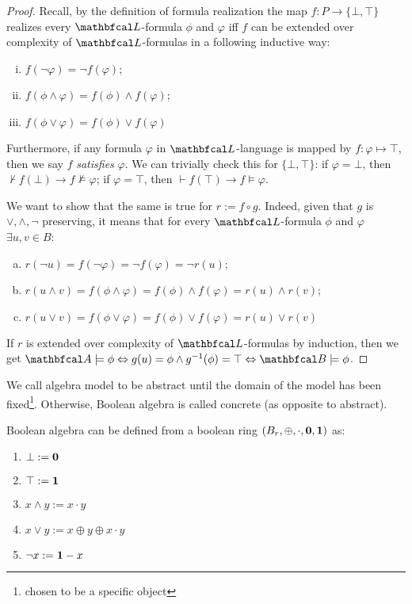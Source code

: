 \begin{proof}
  Recall, by the definition of formula realization\cite{halbeisen2012} the map $f: P \to \{\bot,\top\}$ realizes every $\lsign$-formula $\phi$ and $\varphi$ iff $f$ can be extended over complexity of $\lsign$-formulas in a following inductive way: 
  \begin{enumerate}[(i)]
    \item $f(\neg \varphi) = \neg f(\varphi)$;
    \item $f(\phi \land \varphi) = f(\phi) \land f(\varphi)$;
    \item $f(\phi \lor \varphi) = f(\phi) \lor f(\varphi)$
  \end{enumerate}
  Furthermore, if any formula $\varphi$ in $\lsign$-language is mapped by $f: \varphi \mapsto \top$, then we say $f$ \textit{satisfies} $\varphi$. We can trivially check this for $\{\bot,\top\}$: if $\varphi = \bot$, then $\nvdash f(\bot) \rightarrow f \not\models \varphi$; if $\varphi = \top$, then $\vdash f(\top) \rightarrow f \models \varphi$.

  We want to show that the same is true for $r := f \circ g$. Indeed, given that $g$ is $\lor, \land, \neg$ preserving, it means that for every $\lsign$-formula $\phi$ and $\varphi$ $\exists u,v \in B$:
  \begin{enumerate}[a)]
    \item $r(\neg u) = f(\neg \varphi) = \neg f(\varphi) = \neg r(u)$;
    \item $r(u \land v) = f(\phi \land \varphi) = f(\phi) \land f(\varphi) = r(u) \land r(v)$;
    \item $r(u \lor v) = f(\phi \lor \varphi) = f(\phi) \lor f(\varphi) = r(u) \lor r(v)$
  \end{enumerate}
  If $r$ is extended over complexity of $\lsign$-formulas by induction, then we get $\LsA \models \phi \Leftrightarrow  g(u) = \phi \land g^{-1}(\phi) = \top \Leftrightarrow \LsB \models \phi$. 
\end{proof}


We call algebra model to be abstract until the domain of the model has been fixed\footnote{chosen to be a specific object}. Otherwise, Boolean algebra is called concrete (as opposite to abstract).



Boolean algebra can be defined from a boolean ring $(B_r, \oplus, \cdot, \textbf{0}, \textbf{1})$ as:
\begin{enumerate}
  \item $\bot := \textbf{0}$
  \item $\top := \textbf{1}$
  \item $ x \land y := x \cdot y$
  \item $ x \lor y := x \oplus y \oplus x \cdot y$ 
  \item $ \neg x  := \textbf{1} - x$
\end{enumerate}

